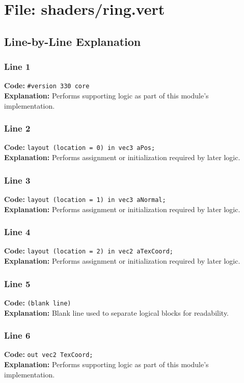\documentclass[11pt,a4paper]{article}
\begin{document}
\newpage
\section{File: shaders/ring.vert}
\subsection{Line-by-Line Explanation}
\subsubsection*{Line 1}
\textbf{Code:} \verb|#version 330 core|\\
\textbf{Explanation:} Performs supporting logic as part of this module's implementation.

\subsubsection*{Line 2}
\textbf{Code:} \verb|layout (location = 0) in vec3 aPos;|\\
\textbf{Explanation:} Performs assignment or initialization required by later logic.

\subsubsection*{Line 3}
\textbf{Code:} \verb|layout (location = 1) in vec3 aNormal;|\\
\textbf{Explanation:} Performs assignment or initialization required by later logic.

\subsubsection*{Line 4}
\textbf{Code:} \verb|layout (location = 2) in vec2 aTexCoord;|\\
\textbf{Explanation:} Performs assignment or initialization required by later logic.

\subsubsection*{Line 5}
\textbf{Code:} \texttt{(blank line)}\\
\textbf{Explanation:} Blank line used to separate logical blocks for readability.

\subsubsection*{Line 6}
\textbf{Code:} \verb|out vec2 TexCoord;|\\
\textbf{Explanation:} Performs supporting logic as part of this module's implementation.
\end{document}
